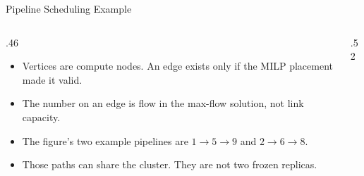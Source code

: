 \begin{frame}[t,label=mm_hx_pipe_01]{Pipeline Scheduling Example}

  \par
  \vspace{.02cm}
  \begin{columns}[c,onlytextwidth]
    \begin{column}{.46\textwidth}
      {\footnotesize\begin{itemize}\setlength{\itemsep}{.07cm}
        \item Vertices are compute nodes. An edge exists only if the MILP placement made it valid.
        \item The number on an edge is flow in the max-flow solution, not link capacity.
        \item The figure's two example pipelines are \(1\rightarrow 5\rightarrow 9\) and \(2\rightarrow 6\rightarrow 8\).
        \item Those paths can share the cluster. They are not two frozen replicas.
      \end{itemize}}
      \vspace{.12cm}
    \end{column}
    \begin{column}{.52\textwidth}
    \end{column}
  \end{columns}
\end{frame}

